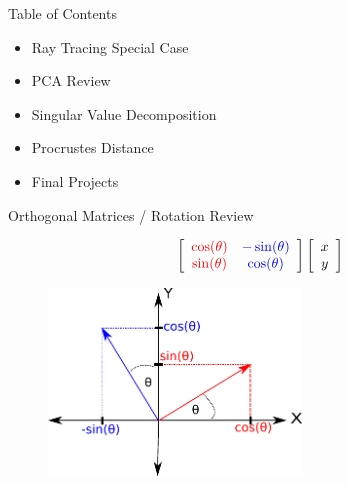 \documentclass{beamer}
\begin{document}
\begin{frame}{Table of Contents}
\begin{itemize}[label=$\vartriangleright$]
	\item Ray Tracing Special Case
\end{itemize}
\begin{itemize}[label=$\vartriangleright$]
	\item PCA Review
\end{itemize}
\begin{itemize}[label=$\blacktriangleright$]
	\item Singular Value Decomposition
\end{itemize}
\begin{itemize}[label=$\vartriangleright$]
	\item Procrustes Distance
\end{itemize}
\begin{itemize}[label=$\vartriangleright$]
	\item Final Projects
\end{itemize}
\end{frame}

\begin{frame}{Orthogonal Matrices / Rotation Review}

\[ \left[ \begin{array}{cc} \textcolor{red}{\cos(\theta)} & \textcolor{blue}{-\sin(\theta)} \\ \textcolor{red}{\sin(\theta)} & \textcolor{blue}{\cos(\theta)} \end{array}  \right] \left[ \begin{array}{c} x \\ y \end{array} \right]\]

\begin{figure}[t]
	\centering
    \includegraphics[width=0.6\textwidth]{ColumnVectorRot2.pdf}
\end{figure}

\end{frame}
\end{document}
